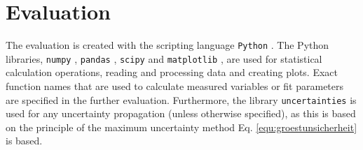 \section{Evaluation}
\label{sec:auswertung}
The evaluation is created with the scripting language \verb|Python| \cite{PYTHON}.
The Python libraries, \verb|numpy| \cite{harris2020array}, \verb|pandas| \cite{reback2020pandas}, \verb|scipy| \cite{2020SciPy-NMeth} and \verb|matplotlib| \cite{Hunter:2007}, are used for statistical calculation operations, reading and processing data and creating plots.
Exact function names that are used to calculate measured variables or fit parameters are specified in the further evaluation.
Furthermore, the library \verb|uncertainties| \cite{UN} is used for any uncertainty propagation (unless otherwise specified), as this is based on the principle of the maximum uncertainty method Eq. \ref{equ:groestunsicherheit} is based.
